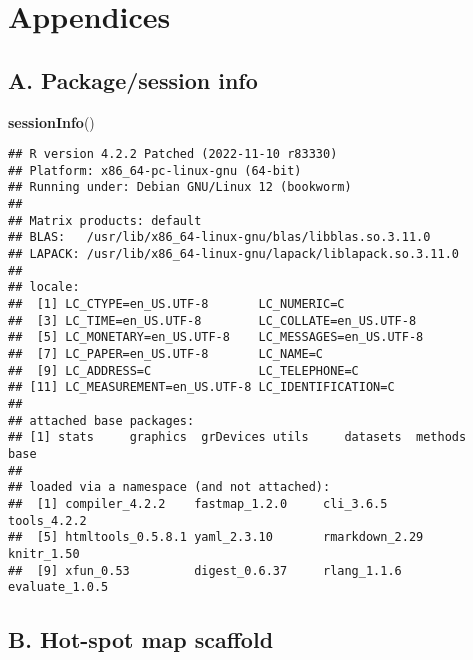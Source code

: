 \documentclass[
]{article}
\newenvironment{Shaded}{\begin{snugshade}}{\end{snugshade}}
\newcommand{\FunctionTok}[1]{\textcolor[rgb]{0.13,0.29,0.53}{\textbf{#1}}}
\newcommand{\NormalTok}[1]{#1}
\begin{document}
\section{Appendices}\label{appendices}

\subsection{A. Package/session info}\label{a.-packagesession-info}

\begin{Shaded}
\begin{Highlighting}[]
\FunctionTok{sessionInfo}\NormalTok{()}
\end{Highlighting}
\end{Shaded}

\begin{verbatim}
## R version 4.2.2 Patched (2022-11-10 r83330)
## Platform: x86_64-pc-linux-gnu (64-bit)
## Running under: Debian GNU/Linux 12 (bookworm)
## 
## Matrix products: default
## BLAS:   /usr/lib/x86_64-linux-gnu/blas/libblas.so.3.11.0
## LAPACK: /usr/lib/x86_64-linux-gnu/lapack/liblapack.so.3.11.0
## 
## locale:
##  [1] LC_CTYPE=en_US.UTF-8       LC_NUMERIC=C              
##  [3] LC_TIME=en_US.UTF-8        LC_COLLATE=en_US.UTF-8    
##  [5] LC_MONETARY=en_US.UTF-8    LC_MESSAGES=en_US.UTF-8   
##  [7] LC_PAPER=en_US.UTF-8       LC_NAME=C                 
##  [9] LC_ADDRESS=C               LC_TELEPHONE=C            
## [11] LC_MEASUREMENT=en_US.UTF-8 LC_IDENTIFICATION=C       
## 
## attached base packages:
## [1] stats     graphics  grDevices utils     datasets  methods   base     
## 
## loaded via a namespace (and not attached):
##  [1] compiler_4.2.2    fastmap_1.2.0     cli_3.6.5         tools_4.2.2      
##  [5] htmltools_0.5.8.1 yaml_2.3.10       rmarkdown_2.29    knitr_1.50       
##  [9] xfun_0.53         digest_0.6.37     rlang_1.1.6       evaluate_1.0.5
\end{verbatim}

\subsection{B. Hot-spot map scaffold}\label{b.-hot-spot-map-scaffold}
\end{document}
